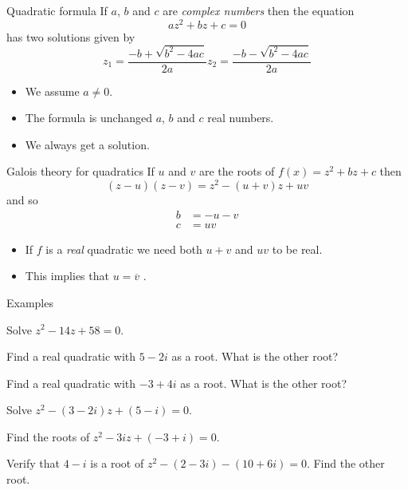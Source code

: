 \documentclass{beamer}
\begin{document}
\begin{frame}{Quadratic formula}
If $a$, $b$ and $c$ are \emph{complex numbers} then the equation
\begin{equation*}
az^2+bz+c = 0
\end{equation*}
has two solutions given by
\begin{equation*}
	z_1 = \frac{-b+\sqrt{b^2-4ac}}{2a} z_2 = \frac{-b-\sqrt{b^2-4ac}}{2a}
\end{equation*}
\begin{itemize}
	\item We assume $a\neq 0$.
	\item The formula is unchanged $a$, $b$ and $c$ real numbers.
	\item We always get a solution.
\end{itemize}
\end{frame}

\begin{frame}{Galois theory for quadratics}
If $u$ and $v$ are the roots of $f(x) = z^2 + bz+c$ then
\begin{equation*}
(z-u)(z-v) = z^2 - (u+v)z + uv
\end{equation*}
and so
\begin{align*}
b & = -u-v\\
c & = uv
\end{align*}
\begin{itemize}
	\item If $f$ is a \emph{real} quadratic we need both $u+v$ and $uv$ to be real.
	\item This implies that $u = \overline{v}$ .
\end{itemize}
\end{frame}

\begin{frame}{Examples}
\begin{example}
Solve $z^2-14z+58 = 0$.
\end{example}
\begin{example}
Find a real quadratic with $5-2i$ as a root. What is the other root?
\end{example}
\begin{example}
Find a real quadratic with $-3+4i$ as a root. What is the other root?
\end{example}
\begin{example}
Solve $z^2-(3-2i)z + (5-i) = 0$.
\end{example}
\begin{example}
Find the roots of $z^2-3iz+(-3+i) = 0$.
\end{example}
\end{frame}

\begin{frame}
\begin{example}
Verify that $4-i$ is a root of $z^2 - (2-3i)-(10+6i) = 0$. Find the other root.
\end{example}
\end{frame}
\end{document}
